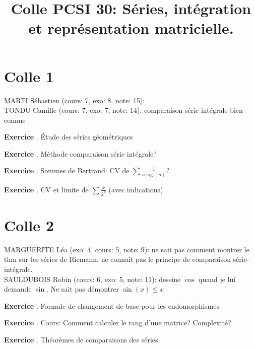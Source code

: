 \documentclass[10pt,a4paper]{article}
\title{Colle PCSI 30: Séries, intégration et représentation matricielle.}
\newcounter{question}
\newcounter{exo}
\newenvironment{exo}{\vspace{0.5cm}\setcounter{question}{0}\addtocounter{exo}{1} \noindent \textbf{Exercice \theexo}. \normalsize }{\par}
\begin{document}
	\maketitle
	
	\section*{Colle 1}
	\setcounter{exo}{0}
	MARTI Sébastien (cours: 7, exo: 8, note: 15):\\
	TONDU Camille (cours: 7, exo: 7, note: 14): comparaison série intégrale bien connue
	
	\begin{exo}
		 Étude des séries géométriques
	\end{exo}

	\begin{exo}
		Méthode comparaison série intégrale?
	\end{exo}

	\begin{exo}
		Sommes de Bertrand: CV de $\sum \frac{1}{n \log(n)}$?
	\end{exo}	
	
	\begin{exo}
		CV et limite de $\sum{\frac{k}{2^k}}$ (avec indications)
	\end{exo}
	
	\section*{Colle 2}
	\setcounter{exo}{0}
	MARGUERITE Léa (exo: 4, cours: 5, note: 9): ne sait pas comment montrer le thm sur les séries de Riemann. ne connaît pas le principe de comparaison série-intégrale.\\
	SAULDUBOIS Robin (cours: 6, exo: 5, note: 11): dessine $\cos$ quand je lui demande $\sin$. Ne sait pas démontrer $\sin(x) \leq x$\\
	
	\begin{exo}
		Formule de changement de base pour les endomorphismes
	\end{exo}
	
	\begin{exo}
		Cours: Comment calculer le rang d’une matrice? Complexité?
	\end{exo}		
	
	\begin{exo}
		Théorèmes de comparaisons des séries.
	\end{exo}		
	
\end{document}

